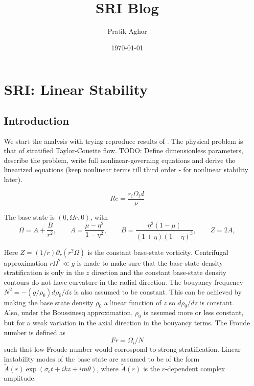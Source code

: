 \documentclass{article}
\author{Pratik Aghor}
\title{SRI Blog}
\date{\today}  %
\begin{document}
\maketitle
\section*{SRI: Linear Stability}
\subsection*{Introduction}

We start the analysis with trying reproduce results of \cite{robins2020viscous}. The physical problem is that of stratified Taylor-Couette flow. 
TODO: Define dimensionless parameters, describe the problem, write full nonlinear-governing equations and derive the linearized equations (keep nonlinear terms till third order - for nonlinear stability later).

\begin{equation}\label{def:Re}
 Re = \frac{r_{i}\Omega_{i}d}{\nu}
\end{equation}

The base state is $(0, \Omega r, 0)$, with 
 \noindent
\begin{equation}
\Omega = A + \frac{B}{r^{2}},
\qquad
A = \frac{\mu - \eta^{2}}{1-\eta^{2}},
\qquad
B = \frac{\eta^{2}(1-\mu)}{(1+\eta)(1-\eta)^{3}},
\qquad
Z = 2A,
\label{eqn:base_state}
\end{equation}

Here $Z = (1/r) \partial_{r}(r^{2}\Omega)$ is the constant base-state vorticity. 
Centrifugal approximation $r\Omega^{2}\ll g$ is made to make sure that the base state density stratification is only in the $z$ direction and the constant base-state density contours do not have curvature in the radial direction. The bouyancy frequency $N^{2} = -(g/\rho_{0})d\rho_{0}/dz$ is also assumed to be constant. This can be achieved by making the base state density $\rho_{0}$ a linear function of $z$ so $d\rho_{0}/dz$ is constant. Also, under the Boussinesq approximation, $\rho_{0}$ is assumed more or less constant, but for a weak variation in the axial direction in the bouyancy terms. The Froude number is defined as 
\begin{equation}\label{def:Fr}
 Fr = \Omega_{i}/N
\end{equation}
such that low Froude number would corrospond to strong stratification. Linear instability modes of the base state are assumed to be of the form  $\tilde{A}(r) \exp{(\sigma_{c}t + i k z + i m \theta)}$, where $\tilde{A}(r)$ is the $r$-dependent complex amplitude. 
\end{document}
